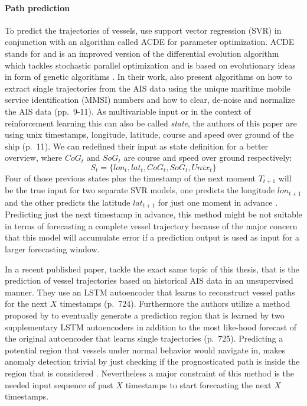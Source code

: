 \paragraph{Path prediction}
To predict the trajectories of vessels, \cite{liu2019vessel} use support vector regression (SVR) in conjunction with an algorithm called ACDE for  parameter optimization. ACDE stands for  and is an improved version of the differential evolution algorithm which tackles stochastic parallel optimization and is based on evolutionary ideas in form of genetic algorithms \cite[pp.~1-3]{thangaraj2009simple}. In their work, \cite{liu2019vessel} also present algorithms on how to extract single trajectories from the AIS data using the unique maritime mobile service identification (MMSI) numbers and how to clear, de-noise and normalize the AIS data (pp.~9-11). As multivariable input or in the context of reinforcement learning this can also be called \textit{state}, the authors of this paper are using unix timestamps, longitude, latitude, course and speed over ground of the ship (p.~11). We can redefined their input as state definition for a better overview, where $CoG_t$ and $SoG_t$ are course and speed over ground respectively:
\begin{equation}
S_t = \{lon_t, lat_t, CoG_t, SoG_t, Unix_t\}
\end{equation}
Four of those previous states plus the timestamp of the next moment $T_{t+1}$ will be the true input for two separate SVR models, one predicts the longitude $lon_{t+1}$ and the other predicts the latitude $lat_{t+1}$ for just one moment in advance \cite[p.~11]{liu2019vessel}. Predicting just the next timestamp in advance, this method might be not suitable in terms of forecasting a complete vessel trajectory because of the major concern that this model will accumulate error if a prediction output is used as input for a larger forecasting window.
\par
In a recent published paper, \cite{venskus2021unsupervised} tackle the exact same topic of this thesis, that is the prediction of vessel trajectories based on historical AIS data in an unsupervised manner. They use an LSTM autoencoder that learns to reconstruct vessel paths for the next $X$ timestamps (p.~724). Furthermore the authors utilize a method proposed by \cite{cruz2019} to eventually generate a prediction region that is learned by two supplementary LSTM autoencoders in addition to the  most like-hood forecast of the original autoencoder that learns single trajectories (p.~725). Predicting a potential region that vessels under normal behavior would navigate in, makes anomaly detection trivial by just checking if the prognosticated path is inside the region that is considered . Nevertheless a major constraint of this method is the needed input sequence of past $X$ timestamps to start forecasting the next $X$ timestamps.
